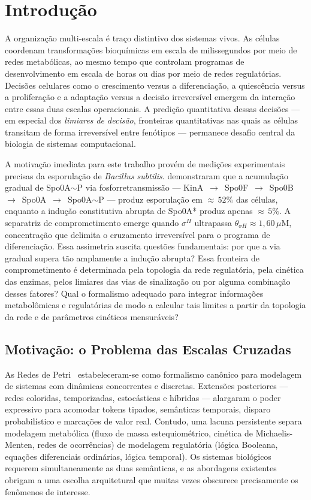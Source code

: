 \chapter{Introdução}
\label{ch:introducao}

A organização multi-escala é traço distintivo dos sistemas vivos. As células
coordenam transformações bioquímicas em escala de milissegundos por meio de
redes metabólicas, ao mesmo tempo que controlam programas de desenvolvimento
em escala de horas ou dias por meio de redes regulatórias. Decisões celulares
como o crescimento versus a diferenciação, a quiescência versus a proliferação e
a adaptação versus a decisão irreversível emergem da interação entre
essas duas escalas operacionais. A predição quantitativa dessas decisões ---
em especial dos \emph{limiares de decisão}, fronteiras quantitativas nas quais
as células transitam de forma irreversível entre fenótipos --- permanece desafio
central da biologia de sistemas computacional.

A motivação imediata para este trabalho provém de medições experimentais precisas
da esporulação de \textit{Bacillus subtilis}. \textcite{Fujita2005}
demonstraram que a acumulação gradual de Spo0A${\sim}$P via fosforretransmissão
--- KinA~$\to$~Spo0F~$\to$~Spo0B~$\to$~Spo0A~$\to$~Spo0A${\sim}$P ---
produz esporulação em ${\approx}\,52\%$ das células, enquanto a indução
constitutiva abrupta de Spo0A* produz apenas ${\approx}\,5\%$. A separatriz
de comprometimento emerge quando $\sigma^H$ ultrapassa
$\theta_{\sigma H} \approx 1{,}60\,\mu$M, concentração que delimita o
cruzamento irreversível para o programa de diferenciação. Essa assimetria
suscita questões fundamentais: por que a via gradual supera tão amplamente a
indução abrupta? Essa fronteira de comprometimento é
determinada pela topologia da rede regulatória, pela cinética das enzimas, pelos
limiares das vias de sinalização ou por alguma combinação desses fatores? Qual
o formalismo adequado para integrar informações metabolômicas e regulatórias de
modo a calcular tais limites a partir da topologia da rede e de parâmetros cinéticos mensuráveis?

\section{Motivação: o Problema das Escalas Cruzadas}
\label{sec:motivacao}

As Redes de Petri~\cite{Petri1962,Murata1989} estabeleceram-se como formalismo
canônico para modelagem de sistemas com dinâmicas concorrentes e discretas.
Extensões posteriores --- redes coloridas, temporizadas, estocásticas e
híbridas --- alargaram o poder expressivo para acomodar tokens tipados, semânticas
temporais, disparo probabilístico e marcações de valor real. Contudo, uma lacuna
persistente separa modelagem metabólica (fluxo de massa estequiométrico, cinética
de Michaelis-Menten, redes de ocorrências) de modelagem regulatória (lógica
Booleana, equações diferenciais ordinárias, lógica temporal). Os sistemas
biológicos requerem simultaneamente as duas semânticas, e as abordagens
existentes obrigam a uma escolha arquitetural que muitas vezes obscurece
precisamente os fenômenos de interesse.

